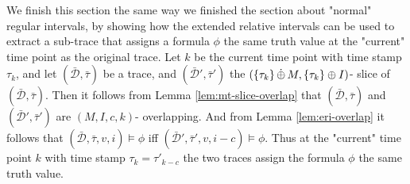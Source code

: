 We finish this section the same way we finished the section about "normal" regular intervals, by showing how the extended relative intervals can be used to extract a sub-trace that assigns a formula $\phi$ the same truth value at the "current" time point as the original trace.
Let $k$ be the current time point with time stamp $\tau_k$, and let $(\bar{\mathcal{D}}, \bar{\tau})$ be a trace, and $(\bar{\mathcal{D}}', \bar{\tau}')$ the $(\{\tau_k\} \,\dot{\oplus}\, M, \{\tau_k\} \oplus I)$- slice of $(\bar{\mathcal{D}}, \bar{\tau})$.
Then it follows from Lemma \ref{lem:mt-slice-overlap} that $(\bar{\mathcal{D}}, \bar{\tau})$ and $(\bar{\mathcal{D}}', \bar{\tau}')$ are $(M,I,c,k)$- overlapping.
And from Lemma \ref{lem:eri-overlap} it follows that $(\bar{\mathcal{D}}, \bar{\tau}, v, i) \models \phi$ iff $(\bar{\mathcal{D}}', \bar{\tau}', v, i-c) \models \phi$.
Thus at the "current" time point $k$ with time stamp $\tau_k = \tau'_{k-c}$ the two traces assign the formula $\phi$ the same truth value.

